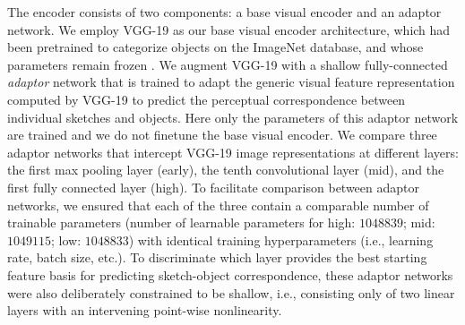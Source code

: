 \documentclass[9pt,twocolumn,twoside]{pnas-new}
\newcommand{\mwu}[1]{{\color{green}{[mwu: #1]}}}
\begin{document}
{The encoder consists of two components: a base visual encoder and an adaptor network. We employ VGG-19 \cite{simonyan2014very} as our base visual encoder architecture, which had been pretrained to categorize objects on the ImageNet database, and whose parameters remain frozen \cite{deng2009imagenet}.
We augment VGG-19 with a shallow fully-connected \textit{adaptor} network that is trained to adapt the generic visual feature representation computed by VGG-19 to predict the perceptual correspondence between individual sketches and objects. 
Here only the parameters of this adaptor network are trained and we do not finetune the base visual encoder. 
We compare three adaptor networks that intercept VGG-19 image representations at different layers: the first max pooling layer (early), the tenth convolutional layer (mid), and the first fully connected layer (high). 
To facilitate comparison between adaptor networks, we ensured that each of the three contain a comparable number of trainable parameters (number of learnable parameters for high: $1048839$; mid: $1049115$; low: $1048833$) with identical training hyperparameters (i.e., learning rate, batch size, etc.). 
To discriminate which layer provides the best starting feature basis for predicting sketch-object correspondence, these adaptor networks were also deliberately constrained to be shallow, i.e., consisting only of two linear layers with an intervening point-wise nonlinearity.

}
\end{document}
